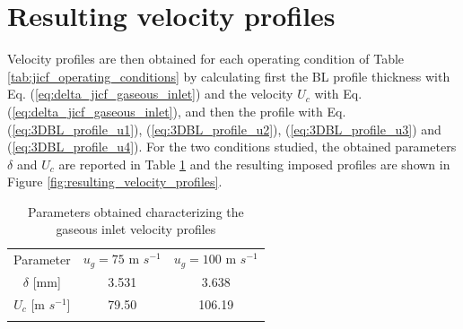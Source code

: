 \section*{Resulting velocity profiles}

Velocity profiles are then obtained for each operating condition of Table \ref{tab:jicf_operating_conditions} by calculating first the BL profile thickness with Eq. (\ref{eq:delta_jicf_gaseous_inlet}) and the velocity $U_c$ with Eq. (\ref{eq:delta_jicf_gaseous_inlet}), and then the profile with Eq. (\ref{eq:3DBL_profile_u1}), (\ref{eq:3DBL_profile_u2}), (\ref{eq:3DBL_profile_u3}) and (\ref{eq:3DBL_profile_u4}). For the two conditions studied, the obtained parameters $\delta$ and $U_c$ are reported in Table \ref{tab:jicf_velocity_profiles_parameters} and the resulting imposed profiles are shown in Figure \ref{fig:resulting_velocity_profiles}.


\begin{table}[!h]
\centering
\caption{Parameters obtained characterizing the gaseous inlet velocity profiles}
\begin{tabular}{ccc}
\thickhline
Parameter &  $u_g = 75$ m $s^{-1}$ &  $u_g = 100$ m $s^{-1}$ \\ 
\thickhline
$\delta$ [mm] & 3.531 & 3.638 \\
$U_c$ [m $s^{-1}$] & 79.50 & 106.19 \\
\thickhline
\end{tabular}
\label{tab:jicf_velocity_profiles_parameters}
\end{table}

